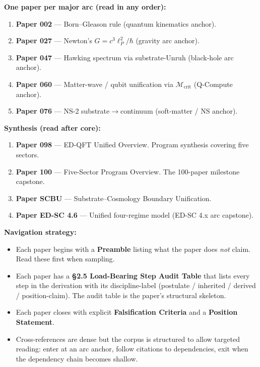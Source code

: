 \documentclass[11pt,a4paper]{article}
\begin{document}
\textbf{One paper per major arc (read in any order):}

\begin{enumerate}
\item \textbf{Paper 002} --- Born--Gleason rule (quantum kinematics anchor).
\item \textbf{Paper 027} --- Newton's $G = c^3 \ell_P^2 / \hbar$ (gravity arc anchor).
\item \textbf{Paper 047} --- Hawking spectrum via substrate-Unruh (black-hole arc anchor).
\item \textbf{Paper 060} --- Matter-wave / qubit unification via $\mathcal{M}_\mathrm{crit}$ (Q-Compute anchor).
\item \textbf{Paper 076} --- NS-2 substrate$\to$continuum (soft-matter / NS anchor).
\end{enumerate}

\textbf{Synthesis (read after core):}

\begin{enumerate}
\item \textbf{Paper 098} --- ED-QFT Unified Overview. Program synthesis covering five sectors.
\item \textbf{Paper 100} --- Five-Sector Program Overview. The 100-paper milestone capstone.
\item \textbf{Paper SCBU} --- Substrate--Cosmology Boundary Unification.
\item \textbf{Paper ED-SC 4.6} --- Unified four-regime model (ED-SC 4.x arc capstone).
\end{enumerate}

\textbf{Navigation strategy:}

\begin{itemize}[noitemsep]
\item Each paper begins with a \textbf{Preamble} listing what the paper does \emph{not} claim. Read these first when sampling.
\item Each paper has a \textbf{\S2.5 Load-Bearing Step Audit Table} that lists every step in the derivation with its discipline-label (postulate / inherited / derived / position-claim). The audit table is the paper's structural skeleton.
\item Each paper closes with explicit \textbf{Falsification Criteria} and a \textbf{Position Statement}.
\item Cross-references are dense but the corpus is structured to allow targeted reading: enter at an arc anchor, follow citations to dependencies, exit when the dependency chain becomes shallow.
\end{itemize}
\end{document}
